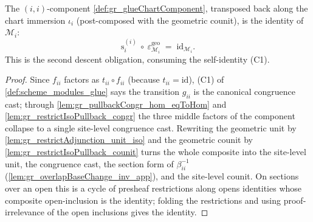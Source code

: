 \begin{lemma}\leanok
  \label{lem:gr_glueChartComponent_self_counit}
  The \((i,i)\)-component \cref{def:gr_glueChartComponent}, transposed back along the
  chart immersion \(\iota_i\) (post-composed with the geometric counit), is the
  identity of \(\mathcal{M}_i\):
  \[
    \mathrm{s}_i^{(i)}\ \circ\ \varepsilon^{\mathrm{geo}}_{\mathcal{M}_i}
      \;=\; \mathrm{id}_{\mathcal{M}_i}.
  \]
  This is the second descent obligation, consuming the self-identity (C1).
\end{lemma}
\begin{proof}
    \leanok
  Since \(f_{ii}\) factors as \(t_{ii}\circ f_{ii}\) (because \(t_{ii} = \mathrm{id}\)),
  (C1) of \cref{def:scheme_modules_glue} says the transition \(g_{ii}\) is the
  canonical congruence cast; through \cref{lem:gr_pullbackCongr_hom_eqToHom} and
  \cref{lem:gr_restrictIsoPullback_congr} the three middle factors of the component
  collapse to a single site-level congruence cast. Rewriting the geometric unit by
  \cref{lem:gr_restrictAdjunction_unit_iso} and the geometric counit by
  \cref{lem:gr_restrictIsoPullback_counit} turns the whole composite into the
  site-level unit, the congruence cast, the section form of \(\beta_{ii}^{-1}\)
  (\cref{lem:gr_overlapBaseChange_inv_app}), and the site-level counit. On sections
  over an open this is a cycle of presheaf restrictions along opens identities whose
  composite open-inclusion is the identity; folding the restrictions and using
  proof-irrelevance of the open inclusions gives the identity.
\end{proof}

